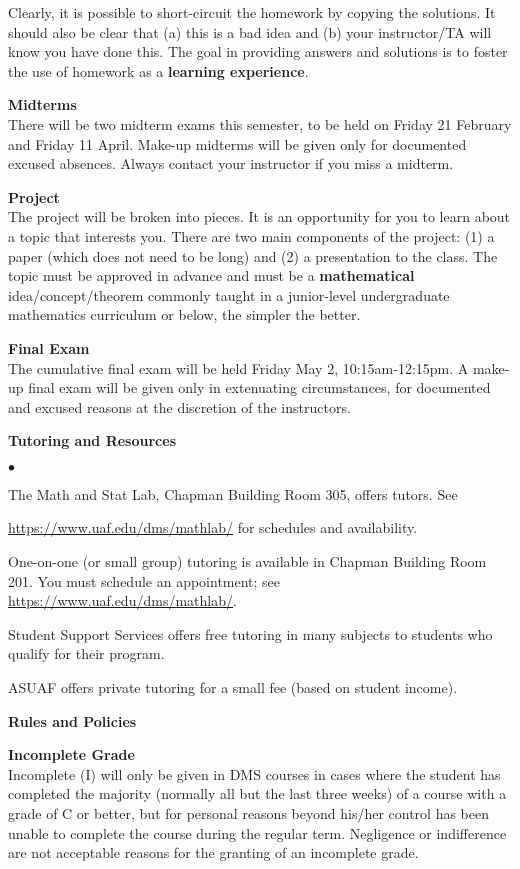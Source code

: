 \documentclass[12pt]{article}
\renewcommand{\emph}[1]{\textsf{\textbf{#1}}}
\newcommand{\localhead}[1]{\par\smallskip\textbf{#1}\nobreak\\}%
\def\heading#1{\localhead{\large\emph{#1}}}
\def\subheading#1{\localhead{\emph{#1}}}
\newenvironment{clist}%
{\bgroup\parskip 0pt\begin{list}{$\bullet$}{\partopsep 4pt\topsep 0pt\itemsep -2pt}}%
{\end{list}\egroup}%
\begin{document}
Clearly, it is possible to short-circuit the homework by copying the solutions. It should also be clear that (a) this is a bad idea and (b) your instructor/TA will know you have done this. The goal in providing answers and solutions is to foster the use of homework as a \emph{learning experience}. 

\heading{Midterms}
There will be two midterm exams this semester, to be held on Friday 21 February and Friday 11 April. Make-up midterms will be given only for documented excused absences. Always contact your instructor if you miss a midterm.

\heading{Project}
The project will be broken into pieces. It is an opportunity for you to learn about a topic that interests you. There are two main components of the project: (1) a paper (which does not need to be long) and (2) a presentation to the class. The topic must be approved in advance and must be a \textbf{mathematical} idea/concept/theorem commonly taught in a junior-level undergraduate mathematics curriculum or below, the simpler the better.  

\heading{Final Exam} 
The cumulative final exam will be held Friday May 2, 10:15am-12:15pm. A make-up final exam will be given only in extenuating circumstances, for documented and excused reasons at the discretion of the instructors.

\heading{Tutoring and Resources}
\vskip -30pt\strut
\begin{clist}
	\item The Math and Stat Lab, Chapman Building Room 305, offers tutors. 
	See 

	\url{https://www.uaf.edu/dms/mathlab/} for schedules and availability.
	\item One-on-one (or small group) tutoring is available in 
Chapman Building Room 201. You must schedule an
appointment; see \url{https://www.uaf.edu/dms/mathlab/}.
	\item Student Support Services offers free tutoring in many subjects to students who qualify for their program.
	\item ASUAF offers private tutoring for a small fee (based on student income).
\end{clist}

\heading{Rules and Policies}
\vskip -20pt

\subheading{Incomplete Grade} 
Incomplete (I) will only be given in
  DMS courses in cases where
  the student has completed the majority (normally all but the last
  three weeks) of a course with a grade of C or better, but for
  personal reasons beyond his/her control has been unable to complete
  the course during the regular term. Negligence or indifference are
  not acceptable reasons for the granting of an incomplete
  grade. 
\end{document}
